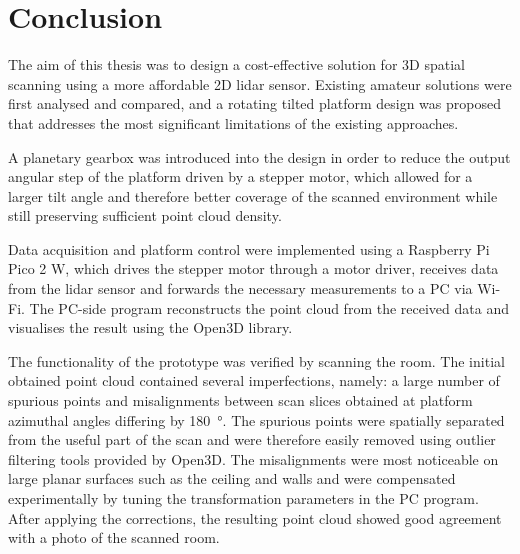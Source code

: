 \chapter{Conclusion}
The aim of this thesis was to design a cost-effective solution for 3D spatial scanning using a more affordable 2D \gls{lidar} sensor.
Existing amateur solutions were first analysed and compared, and a rotating tilted platform design was proposed that addresses the most significant limitations of the existing approaches.

A planetary gearbox was introduced into the design in order to reduce the output angular step of the platform driven by a stepper motor, which allowed for a larger tilt angle and therefore better coverage of the scanned environment while still preserving sufficient point cloud density.

Data acquisition and platform control were implemented using a Raspberry Pi Pico 2 W, which drives the stepper motor through a motor driver, receives data from the \gls{lidar} sensor and forwards the necessary measurements to a PC via Wi-Fi.
The PC-side program reconstructs the point cloud from the received data and visualises the result using the Open3D library.

The functionality of the prototype was verified by scanning the room.
The initial obtained point cloud contained several imperfections, namely: a large number of spurious points and misalignments between scan slices obtained at platform azimuthal angles differing by \SI{180}{\degree}.
The spurious points were spatially separated from the useful part of the scan and were therefore easily removed using outlier filtering tools provided by Open3D.
The misalignments were most noticeable on large planar surfaces such as the ceiling and walls and were compensated experimentally by tuning the transformation parameters in the PC program.
After applying the corrections, the resulting point cloud showed good agreement with a photo of the scanned room.

